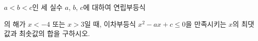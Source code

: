 $a<b<c$인 세 실수 $a$, $b$, $c$에 대하여 연립부등식\par\smallskip{}\par\smallskip\noindent 의 해가 $x<-4$ 또는 $x>3$일 때, 이차부등식 $x^2-ax+c\le 0$을 만족시키는 $x$의 최댓값과 최솟값의 합을 구하시오.
